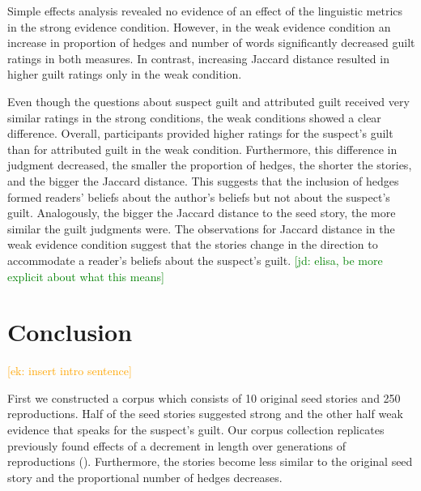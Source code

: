 \documentclass[10pt,letterpaper]{article}
\newcommand{\ek}[1]{\textcolor{Orange}{[ek: #1]}}
\newcommand{\jd}[1]{\textcolor{Green}{[jd: #1]}}
\begin{document}
Simple effects analysis revealed no evidence of an effect of the linguistic metrics in the strong evidence condition. However, in the weak evidence condition an increase in proportion of hedges and number of words significantly decreased guilt ratings in both measures. In contrast, increasing Jaccard distance resulted in higher guilt ratings only in the weak condition.

Even though the questions about suspect guilt and attributed guilt received very similar ratings in the strong conditions, the weak conditions showed a clear difference. Overall, participants provided higher ratings for the suspect's guilt than for attributed guilt in the weak condition. Furthermore, this difference in judgment decreased, the smaller the proportion of hedges, the shorter the stories, and the bigger the Jaccard distance. This suggests that the inclusion of hedges formed readers' beliefs about the author's beliefs but not about the suspect's guilt. Analogously, the bigger the Jaccard distance to the seed story, the more similar the guilt judgments were. The observations for Jaccard distance in the weak evidence condition suggest that the stories change in the direction to accommodate a reader's beliefs about the suspect's guilt. \jd{elisa, be more explicit about what this means}




\section{Conclusion}

\ek{insert intro sentence}

First we constructed a corpus which consists of 10 original seed stories and 250 reproductions. Half of the seed stories suggested strong and the other half weak evidence that speaks for the suspect's guilt. Our corpus collection replicates previously found effects of a decrement in length over generations of reproductions (\cite{Bartlett:1932}). Furthermore, the stories become less similar to the original seed story and the proportional number of hedges decreases.
\end{document}
